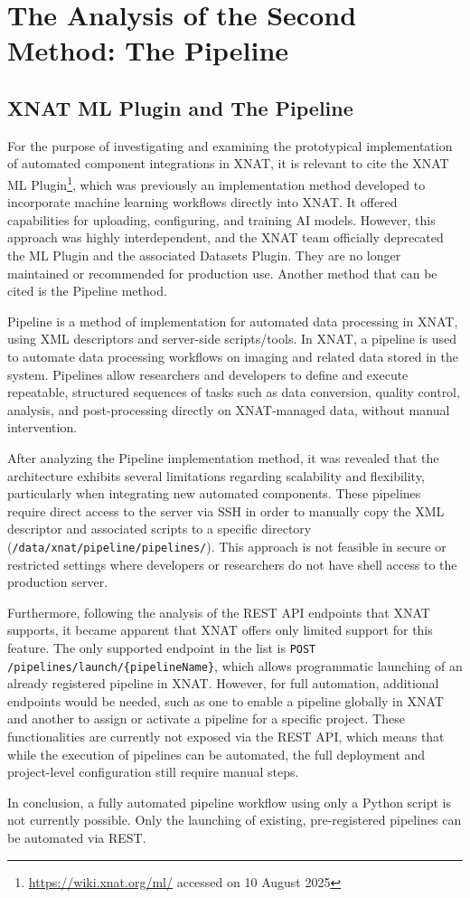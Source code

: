 \chapter{The Analysis of the Second Method: The Pipeline}
\section{XNAT ML Plugin and The Pipeline}

For the purpose of investigating and examining the prototypical implementation of automated component integrations in XNAT, it is relevant to cite the XNAT ML Plugin\footnote{\url{https://wiki.xnat.org/ml/} accessed on 10 August 2025}, which was previously an implementation method developed to incorporate machine learning workflows directly into XNAT. It offered capabilities for uploading, configuring, and training AI models. However, this approach was highly interdependent, and the XNAT team officially deprecated the ML Plugin and the associated Datasets Plugin. They are no longer maintained or recommended for production use. Another method that can be cited is the Pipeline method.

Pipeline is a method of implementation for automated data processing in XNAT, using \ac{XML} descriptors and server-side scripts/tools. In XNAT, a pipeline is used to automate data processing workflows on imaging and related data stored in the system. Pipelines allow researchers and developers to define and execute repeatable, structured sequences of tasks such as data conversion, quality control, analysis, and post-processing directly on XNAT-managed data, without manual intervention.

After analyzing the Pipeline implementation method, it was revealed that the architecture exhibits several limitations regarding scalability and flexibility, particularly when integrating new automated components. These pipelines require direct access to the server via SSH in order to manually copy the XML descriptor and associated scripts to a specific directory (\texttt{/data/xnat/pipeline/pipelines/}). This approach is not feasible in secure or restricted settings where developers or researchers do not have shell access to the production server.

Furthermore, following the analysis of the REST API endpoints that XNAT supports, it became apparent that XNAT offers only limited support for this feature. The only supported endpoint in the list is \texttt{POST /pipelines/launch/\{pipelineName\}}, which allows programmatic launching of an already registered pipeline in XNAT. However, for full automation, additional endpoints would be needed, such as one to enable a pipeline globally in XNAT and another to assign or activate a pipeline for a specific project. These functionalities are currently not exposed via the REST API, which means that while the execution of pipelines can be automated, the full deployment and project-level configuration still require manual steps.

In conclusion, a fully automated pipeline workflow using only a Python script is not currently possible. Only the launching of existing, pre-registered pipelines can be automated via REST.